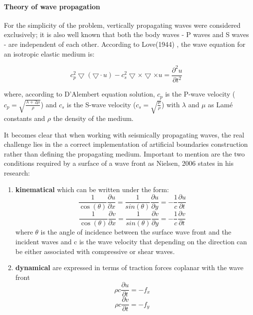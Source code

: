 \paragraph{Theory of wave propagation}
For the simplicity of the problem, vertically propagating waves were considered exclusively; it is also well known that both the body waves - P waves and S waves - are independent of each other. According to Love(1944) \cite{love1944h}, the wave equation for an isotropic elastic medium is:

\begin{equation}
c_p^2\bigtriangledown(\bigtriangledown\cdot u) - c_s^2\bigtriangledown \times \bigtriangledown \times u = \frac{\partial^2 u}{\partial t^2}
\end{equation} 

where, according to D'Alembert equation solution, $c_p$ is the P-wave velocity ($c_p=\sqrt{\frac{\lambda + 2 \mu}{\rho}}$) and $c_s$ is the S-wave velocity ($c_s=\sqrt{\frac{\mu}{\rho}}$) with $\lambda$ and $\mu$ as Lamé constants and $\rho$ the density of the medium.

It becomes clear that when working with seismically propagating waves, the real challenge lies in the a correct implementation of artificial boundaries construction rather than defining the propagating medium. Important to mention are the two conditions required by a surface of a wave front as Nielsen, 2006 \cite{nielsen2006absorbing} states in his research:
\begin{enumerate}
	\item \textbf{kinematical} which can be written under the form:
	\begin{equation}
		\frac{1}{\cos(\theta)}\frac{\partial u}{\partial x}= \frac{1}{sin(\theta)}\frac{\partial u}{\partial y} = - \frac{1}{c}\frac{\partial u}{\partial t}
	\end{equation}
		\begin{equation}
		\frac{1}{\cos(\theta)}\frac{\partial v}{\partial x}= \frac{1}{sin(\theta)}\frac{\partial v}{\partial y} = - \frac{1}{c}\frac{\partial v}{\partial t}
	\end{equation}
	 where $\theta$ is the angle of incidence between the surface wave front and the incident waves and c is the wave velocity that depending on the direction can be either associated with compressive or shear waves.
	\item \textbf{dynamical} are expressed in terms of traction forces coplanar with the wave front
	\begin{equation}
		\rho c \frac{\partial u}{\partial t}= - f_x
	\end{equation}
		\begin{equation}
		\rho c \frac{\partial v}{\partial t}= - f_y
		\end{equation}
\end{enumerate} 

